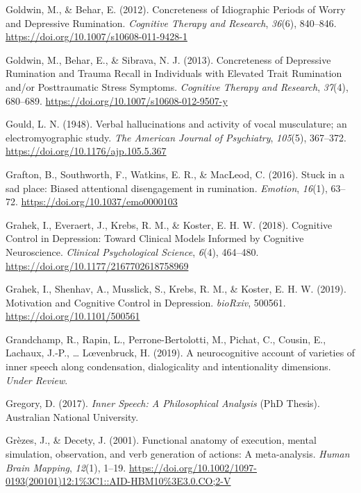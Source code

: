 \documentclass[a4paper,12pt,twoside,onecolumn,openright,final,oldfontcommands]{memoir}
\begin{document}
\leavevmode\hypertarget{ref-goldwin_concreteness_2012}{}%
Goldwin, M., \& Behar, E. (2012). Concreteness of Idiographic Periods of Worry and Depressive Rumination. \emph{Cognitive Therapy and Research}, \emph{36}(6), 840--846. \url{https://doi.org/10.1007/s10608-011-9428-1}

\leavevmode\hypertarget{ref-goldwin_concreteness_2013}{}%
Goldwin, M., Behar, E., \& Sibrava, N. J. (2013). Concreteness of Depressive Rumination and Trauma Recall in Individuals with Elevated Trait Rumination and/or Posttraumatic Stress Symptoms. \emph{Cognitive Therapy and Research}, \emph{37}(4), 680--689. \url{https://doi.org/10.1007/s10608-012-9507-y}

\leavevmode\hypertarget{ref-gould_verbal_1948}{}%
Gould, L. N. (1948). Verbal hallucinations and activity of vocal musculature; an electromyographic study. \emph{The American Journal of Psychiatry}, \emph{105}(5), 367--372. \url{https://doi.org/10.1176/ajp.105.5.367}

\leavevmode\hypertarget{ref-grafton_stuck_2016}{}%
Grafton, B., Southworth, F., Watkins, E. R., \& MacLeod, C. (2016). Stuck in a sad place: Biased attentional disengagement in rumination. \emph{Emotion}, \emph{16}(1), 63--72. \url{https://doi.org/10.1037/emo0000103}

\leavevmode\hypertarget{ref-grahek_cognitive_2018}{}%
Grahek, I., Everaert, J., Krebs, R. M., \& Koster, E. H. W. (2018). Cognitive Control in Depression: Toward Clinical Models Informed by Cognitive Neuroscience. \emph{Clinical Psychological Science}, \emph{6}(4), 464--480. \url{https://doi.org/10.1177/2167702618758969}

\leavevmode\hypertarget{ref-grahek_motivation_2019}{}%
Grahek, I., Shenhav, A., Musslick, S., Krebs, R. M., \& Koster, E. H. W. (2019). Motivation and Cognitive Control in Depression. \emph{bioRxiv}, 500561. \url{https://doi.org/10.1101/500561}

\leavevmode\hypertarget{ref-grandchamp_neurocognitive_2019}{}%
Grandchamp, R., Rapin, L., Perrone-Bertolotti, M., Pichat, C., Cousin, E., Lachaux, J.-P., \ldots{} Lœvenbruck, H. (2019). A neurocognitive account of varieties of inner speech along condensation, dialogicality and intentionality dimensions. \emph{Under Review}.

\leavevmode\hypertarget{ref-gregory_inner_2017}{}%
Gregory, D. (2017). \emph{Inner Speech: A Philosophical Analysis} (PhD Thesis). Australian National University.

\leavevmode\hypertarget{ref-grezes_functional_2001}{}%
Grèzes, J., \& Decety, J. (2001). Functional anatomy of execution, mental simulation, observation, and verb generation of actions: A meta-analysis. \emph{Human Brain Mapping}, \emph{12}(1), 1--19. \url{https://doi.org/10.1002/1097-0193(200101)12:1\%3C1::AID-HBM10\%3E3.0.CO;2-V}
\end{document}
